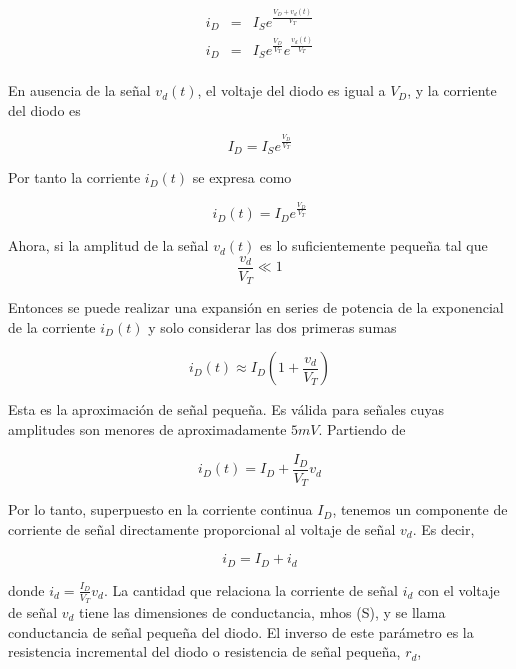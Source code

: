 \begin{eqnarray*}
i_D &=& I_S e^{\frac{V_D + v_d (t)}{V_T}} \\
i_D &=& I_S e^{\frac{V_D}{V_T}}e^{\frac{v_d (t)}{V_T}} \\
\end{eqnarray*}

En ausencia de la señal \( v_d(t) \), el voltaje del diodo es igual a \( V_D \), y la corriente del diodo es

\begin{equation*}
I_D = I_S e^{\frac{V_D}{V_T}}
\end{equation*}

Por tanto la corriente $i_D (t)$ se expresa como

\begin{equation*}
i_D (t) = I_D e^{\frac{V_D}{V_T}}
\end{equation*}

Ahora, si la amplitud de la señal $v_d(t)$ es lo suficientemente pequeña tal que
\begin{equation*}
\frac{v_d}{V_T} \ll 1
\end{equation*}

Entonces se puede realizar una expansión en series de potencia de la exponencial de la corriente $i_D(t)$ y solo considerar las dos primeras sumas

\begin{equation*}
i_D (t) \approx I_D \left( 1 + \frac{v_d}{V_T}\right)
\end{equation*}

Esta es la aproximación de señal pequeña. Es válida para señales cuyas amplitudes son menores de aproximadamente $5 mV$. Partiendo de 

\begin{equation*}
i_D (t) = I_D  + \frac{I_D}{V_T} v_d
\end{equation*}

Por lo tanto, superpuesto en la corriente continua \( I_D \), tenemos un componente de corriente de señal directamente proporcional al voltaje de señal \( v_d \). Es decir,

\begin{equation*}
i_D = I_D + i_d
\end{equation*}

donde $i_d = \frac{I_D}{V_T} v_d$. La cantidad que relaciona la corriente de señal \( i_d \) con el voltaje de señal \( v_d \) tiene las dimensiones de conductancia, mhos (S), y se llama conductancia de señal pequeña del diodo. El inverso de este parámetro es la resistencia incremental del diodo o resistencia de señal pequeña, \( r_d \),


